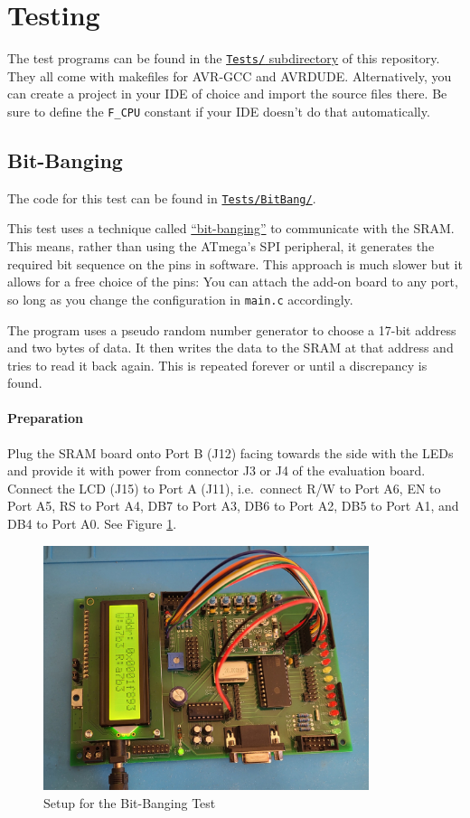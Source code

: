 \documentclass{article}
\newcommand{\file}[1]{\texttt{#1}}
\begin{document}
\section{Testing}
The test programs can be found in the \href{../Tests/}{\file{Tests/} subdirectory} of this repository. They all come with makefiles for AVR-GCC and AVRDUDE. Alternatively, you can create a project in your IDE of choice and import the source files there. Be sure to define the \lstinline[language=C]{F_CPU} constant if your IDE doesn't do that automatically.

\subsection{Bit-Banging}\label{sec:bitBang}
The code for this test can be found in \href{../Tests/BitBang/}{\file{Tests/BitBang/}}. 

This test uses a technique called \href{https://en.wikipedia.org/wiki/Bit_banging}{``bit-banging''} to communicate with the SRAM. This means, rather than using the ATmega's SPI peripheral, it generates the required bit sequence on the pins in software. This approach is much slower but it allows for a free choice of the pins: You can attach the add-on board to any port, so long as you change the configuration in \texttt{main.c} accordingly. 

The program uses a pseudo random number generator to choose a 17-bit address and two bytes of data. It then writes the data to the SRAM at that address and tries to read it back again. This is repeated forever or until a discrepancy is found. 

\paragraph{Preparation}
Plug the SRAM board onto Port B (J12) facing towards the side with the LEDs and provide it with power from connector J3 or J4 of the evaluation board. Connect the LCD (J15) to Port A (J11), i.e.\ connect R/W to Port A6, EN to Port A5, RS to Port A4, DB7 to Port A3, DB6 to Port A2, DB5 to Port A1, and DB4 to Port A0. See Figure \ref{fig:bitBang}. 

\begin{figure}[htb]
\centering
\includegraphics[width=0.85\textwidth]{Pictures/BitBang.jpg}
\caption{Setup for the Bit-Banging Test}
\label{fig:bitBang}
\end{figure}
\end{document}
